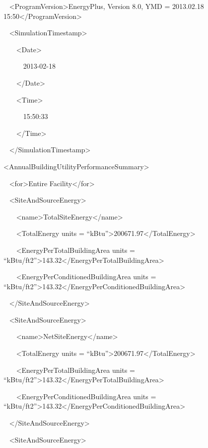 ~ \textless{}ProgramVersion\textgreater{}EnergyPlus, Version 8.0, YMD = 2013.02.18 15:50\textless{}/ProgramVersion\textgreater{}

~ \textless{}SimulationTimestamp\textgreater{}

~~~ \textless{}Date\textgreater{}

~~~~~ 2013-02-18

~~~ \textless{}/Date\textgreater{}

~~~ \textless{}Time\textgreater{}

~~~~~ 15:50:33

~~~ \textless{}/Time\textgreater{}

~ \textless{}/SimulationTimestamp\textgreater{}

\textless{}AnnualBuildingUtilityPerformanceSummary\textgreater{}

~ \textless{}for\textgreater{}Entire Facility\textless{}/for\textgreater{}

~ \textless{}SiteAndSourceEnergy\textgreater{}

~~~ \textless{}name\textgreater{}TotalSiteEnergy\textless{}/name\textgreater{}

~~~ \textless{}TotalEnergy units = ``kBtu''\textgreater{}200671.97\textless{}/TotalEnergy\textgreater{}

~~~ \textless{}EnergyPerTotalBuildingArea units = ``kBtu/ft2''\textgreater{}143.32\textless{}/EnergyPerTotalBuildingArea\textgreater{}

~~~ \textless{}EnergyPerConditionedBuildingArea units = ``kBtu/ft2''\textgreater{}143.32\textless{}/EnergyPerConditionedBuildingArea\textgreater{}

~ \textless{}/SiteAndSourceEnergy\textgreater{}

~ \textless{}SiteAndSourceEnergy\textgreater{}

~~~ \textless{}name\textgreater{}NetSiteEnergy\textless{}/name\textgreater{}

~~~ \textless{}TotalEnergy units = ``kBtu''\textgreater{}200671.97\textless{}/TotalEnergy\textgreater{}

~~~ \textless{}EnergyPerTotalBuildingArea units = ``kBtu/ft2''\textgreater{}143.32\textless{}/EnergyPerTotalBuildingArea\textgreater{}

~~~ \textless{}EnergyPerConditionedBuildingArea units = ``kBtu/ft2''\textgreater{}143.32\textless{}/EnergyPerConditionedBuildingArea\textgreater{}

~ \textless{}/SiteAndSourceEnergy\textgreater{}

~ \textless{}SiteAndSourceEnergy\textgreater{}

